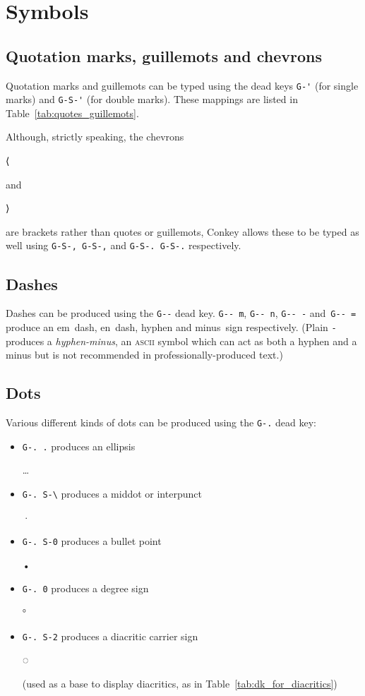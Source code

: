\documentclass[oneside]{memoir}
\newcommand{\key}{\verb}
\newcommand{\out}[1]{\colorbox{gray!20}{\strut{}#1}}
\begin{document}
\section{Symbols}
\label{sec:symbols}

\subsection{Quotation marks, guillemots and chevrons}
\label{sec:quotation_marks_guillemots_chevrons}

Quotation marks and guillemots can be typed using the dead keys
  \key|G-'| (for single marks) and \key|G-S-'| (for double marks).
These mappings are listed in Table~\ref{tab:quotes_guillemots}.

Although, strictly speaking, the chevrons \out{⟨} and \out{⟩} are brackets rather than quotes or guillemots,
  Conkey allows these to be typed as well using \key|G-S-, G-S-,| and \key|G-S-. G-S-.| respectively.

\subsection{Dashes}
\label{sec:dashes}

Dashes can be produced using the \key|G--| dead key.
\key|G-- m|, \key|G-- n|, \key|G-- -| and~\key|G-- =|
  produce an em~dash, en~dash, hyphen and minus~sign respectively.
(Plain \key|-| produces a \textit{hyphen-minus},
  an \textsc{ascii} symbol which can act as both a hyphen and a minus
  but is not recommended in professionally-produced text.)

\subsection{Dots}
\label{sec:dots}

Various different kinds of dots can be produced using the \key|G-.| dead key:

\begin{itemize}[noitemsep]
\item \key|G-. .| produces an ellipsis \out{…}
\item \key|G-. S-\| produces a middot or interpunct \out{·}
\item \key|G-. S-0| produces a bullet point \out{•}
\item \key|G-. 0| produces a degree sign \out{°}
\item \key|G-. S-2| produces a diacritic carrier sign \out{◌}
  (used as a base to display diacritics, as in Table~\ref{tab:dk_for_diacritics})
\end{itemize}
\end{document}
